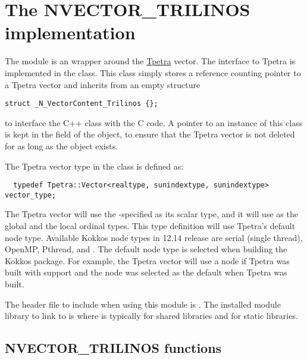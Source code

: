 %
\section{The NVECTOR\_TRILINOS implementation}\label{ss:nvec_trilinos}

The {\nvectrilinos} module is an {\nvector} wrapper around the {\trilinos}
\href{https://github.com/trilinos/Trilinos}{Tpetra} vector. The interface
to Tpetra is implemented in the  class. This
class simply stores a reference counting pointer to a Tpetra vector and
inherits from an empty structure
\begin{verbatim}
struct _N_VectorContent_Trilinos {};
\end{verbatim}
to interface the C++ class with the {\nvector} C code.
A pointer to an instance of this class is kept in the  field
of the  object, to ensure that the Tpetra vector
is not deleted for as long as the  object exists.

The Tpetra vector type in the  class is defined
as:
\begin{verbatim}
  typedef Tpetra::Vector<realtype, sunindextype, sunindextype> vector_type;
\end{verbatim}
The Tpetra vector will use the {\sundials}-specified  as its scalar
type, and it will use  as the global and the local ordinal types.
This type definition will use Tpetra's default node type. Available Kokkos node
types in {\trilinos} 12.14 release are serial (single thread), OpenMP, Pthread,
and {\cuda}. The default node type is selected when building the Kokkos package.
For example, the Tpetra vector will use a {\cuda} node if Tpetra was built with
{\cuda} support and the {\cuda} node was selected as the default when Tpetra was
built.

The header file to include when using this module is .
The installed module library to link to is
where  is typically  for shared libraries and 
for static libraries.


\subsection{NVECTOR\_TRILINOS functions}
\label{ss:nvec_trilinos_functions}

